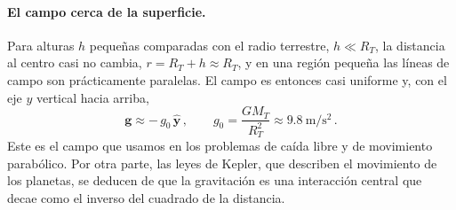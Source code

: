 \paragraph{El campo cerca de la superficie.}
Para alturas $h$ pequeñas comparadas con el radio terrestre, $h \ll R_T$, la
distancia al centro casi no cambia, $r = R_T + h \approx R_T$, y en una
región pequeña las líneas de campo son prácticamente paralelas. El campo es
entonces casi uniforme y, con el eje $y$ vertical hacia arriba,
\begin{equation}
  \boldsymbol{g} \approx -\,g_0\,\hat{\boldsymbol{y}} \,,
  \qquad
  g_0 = \frac{G M_T}{R_T^{2}} \approx \SI{9.8}{\meter\per\second\squared} \,.
  \label{eq:campo_uniforme}
\end{equation}
Este es el campo que usamos en los problemas de caída libre y de movimiento
parabólico. Por otra parte, las leyes de Kepler, que describen el movimiento
de los planetas, se deducen de que la gravitación es una interacción central
que decae como el inverso del cuadrado de la distancia.
